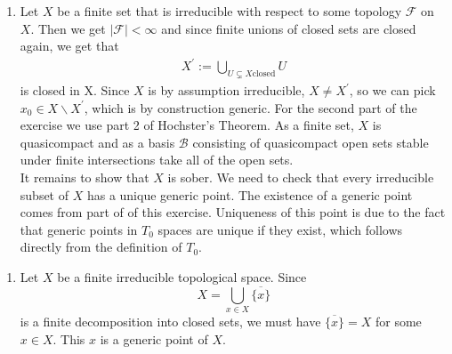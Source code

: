 \newcommand{\sheet}{3}




\maketitle{}

\begin{exercise}{1}
    \begin{enumerate}
        \item Let $X$ be a finite set that is irreducible with 
        respect to some topology $\mathcal{F}$ on $X$. Then we get
        $\mid \mathcal{F} \mid<\infty$ and since finite unions of
        closed sets are closed again, we get that
        \begin{align*}
            X^{\prime}:=\bigcup_{U \subsetneq X \text{closed}}{U}
        \end{align*}
        is closed in X. Since $X$ is by assumption irreducible,
        $X\neq X^{\prime}$, so we can pick $x_0\in X \backslash X^{\prime}$,
        which is by construction generic. For the second part of the exercise we use 
        part 2 of Hochster's Theorem. As a finite set, $X$ is 
        quasicompact and as a basis $\mathcal{B}$ consisting of quasicompact 
        open sets stable under finite intersections take all of the open sets. \\
        It remains to show that $X$ is sober. We need to check that every irreducible
        subset of $X$ has a unique generic point. The existence of a generic point comes
        from part of of this exercise. Uniqueness of this point is due to the fact
        that generic points in $T_0$ spaces are unique if they exist, which follows directly
        from the definition of $T_0$.
    \end{enumerate}
    
    \begin{enumerate}
        \item{
                Let $X$ be a finite irreducible topological space. Since
                \begin{equation*} X = \bigcup_{x \in X} \overline{\{x\}}
                \end{equation*} is a finite decomposition into closed sets, we
                must have $\overline{\{x\}} = X$ for some $x \in X$. This $x$ is
                a generic point of $X$.

}
\end{enumerate}
\end{exercise}
